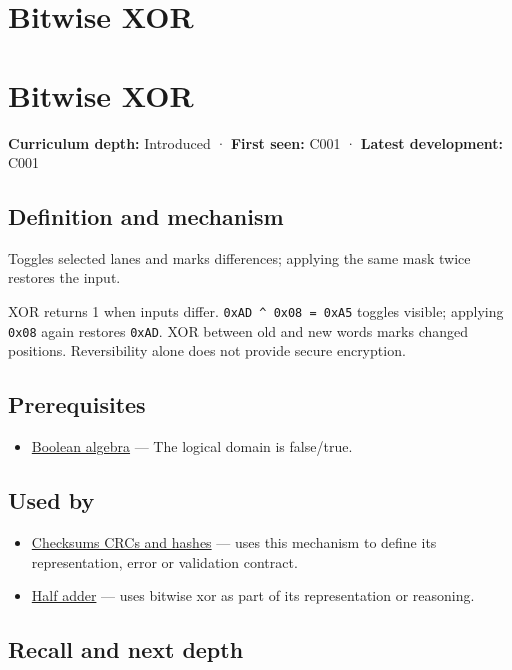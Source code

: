 \hypertarget{appendix-d49161831368}{}
\section*{Bitwise XOR}
\section{Bitwise XOR}\label{bitwise-xor}

\textbf{Curriculum depth:} Introduced · \textbf{First seen:} C001 · \textbf{Latest development:} C001

\subsection{Definition and mechanism}\label{definition-and-mechanism}

Toggles selected lanes and marks differences; applying the same mask twice restores the input.

XOR returns 1 when inputs differ. \texttt{0xAD\ \^{}\ 0x08\ =\ 0xA5} toggles visible; applying \texttt{0x08} again restores \texttt{0xAD}. XOR between old and new words marks changed positions. Reversibility alone does not provide secure encryption.

\subsection{Prerequisites}\label{prerequisites}

\begin{itemize}
\tightlist
\item
  \hyperref[appendix-24475e1596a8]{Boolean algebra} --- The logical domain is false/true.
\end{itemize}

\subsection{Used by}\label{used-by}

\begin{itemize}
\item
  \hyperref[appendix-ed338677de0a]{Checksums CRCs and hashes} --- uses this mechanism to define its representation, error or validation contract.
\item
  \hyperref[appendix-1652d27a8e90]{Half adder} --- uses bitwise xor as part of its representation or reasoning.
\end{itemize}

\subsection{Recall and next depth}\label{recall-and-next-depth}

